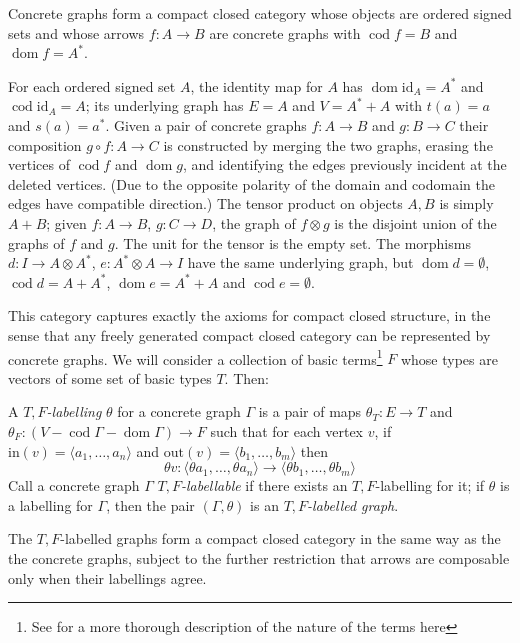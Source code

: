 \documentclass[runningheads]{llncs}
\newcommand{\dom}{\operatorname{dom}}
\newcommand{\cod}{\operatorname{cod}}
\newcommand{\id}[1]{\ensuremath{\mathrm{id}_{#1}}}
\begin{document}
\begin{proposition}
Concrete graphs form a compact closed category whose objects are
ordered signed sets and whose arrows $f:A\to B$ are concrete graphs with
$\cod f = B$  and $\dom f = A^*$.
\end{proposition}
For each ordered signed set $A$, the identity map for $A$ has
$\dom \id{A} = A^*$ and $\cod \id{A} = A$; its underlying
graph has $E = A$ and $V = A^* + A$ with $t(a) = a$ and $s(a) =
a^*$.  Given a pair of concrete graphs $f:A\to B$ and $g:B\to C$ their
composition $g\circ f:A\to C$ is constructed by merging the two
graphs, erasing the vertices of $\cod f$ and $\dom g$, and identifying
the edges previously incident at the deleted vertices.  (Due to the
opposite polarity of the domain and codomain the edges have compatible
direction.)  The tensor product on objects $A,B$ is simply $A+B$;
given $f:A\to B$, $g: C\to D$, the graph of $f \otimes g$ is the
disjoint union of the graphs of $f$ and $g$.  The unit for the tensor
is the empty set.  The morphisms $d : I \to A \otimes A^*$,
$e: A^* \otimes A \to I$ have the same underlying graph, but $\dom d =
\emptyset$, $\cod d = A+A^*$, $\dom e = A^*+A$ and $\cod e = \emptyset$.

This category captures exactly the axioms for compact closed
structure, in the sense that any freely generated compact closed
category can be represented by concrete graphs.  We will consider
a collection of basic terms\footnote{See \cite{Duncan:thesis:2006} for
  a more thorough description of the nature of the terms here} $F$
whose types are vectors of some set of basic types $T$.  Then:

\begin{definition}
  A \emph{$T,F$-labelling} $\theta$ for a concrete graph $\Gamma$ is a pair of
  maps  $\theta_T : E \to T$ and $\theta_F : (V - \cod\Gamma -
  \dom\Gamma) \to F$  such that for each vertex  $v$, if
  $\text{in}(v) = \langle a_1, \ldots, a_n\rangle$ and $\text{out}(v)
  = \langle b_1, \ldots, b_m\rangle$ then 
  \[
  \theta v : \langle \theta a_1, \ldots, \theta a_n \rangle
  \to 
  \langle \theta b_1, \ldots, \theta b_m \rangle
  \]
  Call a concrete graph $\Gamma$ \emph{$T,F$-labellable} if there exists an 
  $T,F$-labelling for it; if $\theta$ is a labelling for $\Gamma$, then
 the pair $(\Gamma,\theta)$ is an \emph{$T,F$-labelled graph}.
\end{definition}

The $T,F$-labelled graphs form a compact closed category in the same
way as the the concrete graphs, subject to the further restriction
that arrows are composable only when their labellings agree.  
\end{document}
